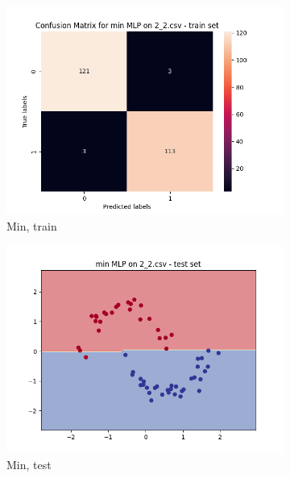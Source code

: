 \documentclass[12pt]{article}
\newcommand*{\subfigwidth}{0.24\textwidth}
\begin{document}
\begin{figure}[H]
\begin{subfigure}[t]{\subfigwidth}
        \includegraphics[width=\linewidth]{img/exp_2/mlp/2_2/min/train_matrix.png}
        \caption{Min, train}
    \end{subfigure}
    \hfill
    \begin{subfigure}[t]{\subfigwidth}
        \includegraphics[width=\linewidth]{img/exp_2/mlp/2_2/min/test_boundary.png}
        \caption{Min, test}
    \end{subfigure}
    \hfill
    \begin{subfigure}[t]{\subfigwidth}

\end{subfigure}
\end{figure}
\end{document}
